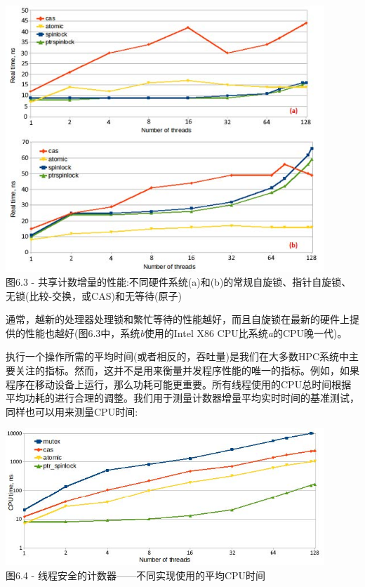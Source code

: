 \begin{center}
\includegraphics[width=0.9\textwidth]{content/2/chapter6/images/3.jpg}\\
图6.3 - 共享计数增量的性能:不同硬件系统(a)和(b)的常规自旋锁、指针自旋锁、无锁(比较-交换，或CAS)和无等待(原子)
\end{center}

通常，越新的处理器处理锁和繁忙等待的性能越好，而且自旋锁在最新的硬件上提供的性能也越好(图6.3中，系统\textit{b}使用的Intel X86 CPU比系统\textit{a}的CPU晚一代)。

执行一个操作所需的平均时间(或者相反的，吞吐量)是我们在大多数HPC系统中主要关注的指标。然而，这并不是用来衡量并发程序性能的唯一的指标。例如，如果程序在移动设备上运行，那么功耗可能更重要。所有线程使用的CPU总时间根据平均功耗的进行合理的调整。我们用于测量计数器增量平均实时时间的基准测试，同样也可以用来测量CPU时间:

\begin{center}
\includegraphics[width=0.9\textwidth]{content/2/chapter6/images/4.jpg}\\
图6.4 - 线程安全的计数器——不同实现使用的平均CPU时间
\end{center}


